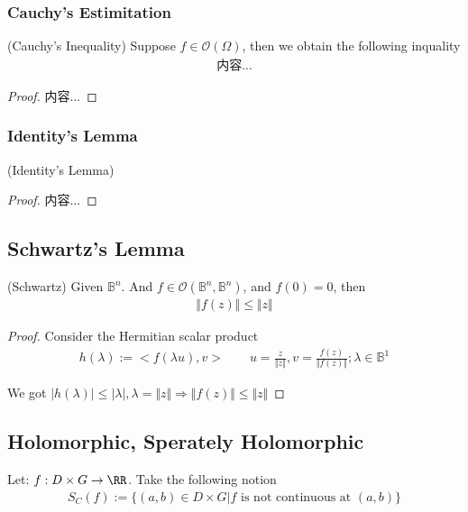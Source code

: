 \documentclass[Total.tex]{subfiles}
\begin{document}
		\subsubsection{Cauchy's Estimitation}
			\begin{proposition}
				(Cauchy's Inequality) Suppose $f\in \mathcal{O}(\Omega)$, then we obtain the following inquality
				\begin{gather*}
					内容...
				\end{gather*}
			\end{proposition}
			\begin{proof}
				内容...
			\end{proof}
			
		\subsubsection{Identity's Lemma}
			\begin{theorem}
				(Identity's Lemma)
			\end{theorem}
			\begin{proof}
				内容...
			\end{proof}
		\subsection{Schwartz's Lemma}
			\begin{theorem}
				(Schwartz) Given $\mathbb{B}^n$. And $f\in \mathcal{O}(\mathbb{B}^n,\mathbb{B}^n)$, and $f(0)=0$, then
				\begin{gather*}
					\Vert f(z)\Vert\leq \Vert z\Vert
				\end{gather*}
			\end{theorem}
			\begin{proof}
				Consider the Hermitian scalar product
				\begin{gather*}
					h(\lambda):=<f(\lambda u),v>\qquad u=\frac{z}{\Vert z\Vert},v=\frac{f(z)}{\Vert f(z)\Vert};\lambda\in \mathbb{B}^1
				\end{gather*}
				
				We got $|h(\lambda)|\leq |\lambda|,\lambda=\Vert z\Vert\Rightarrow \Vert f(z)\Vert\leq \Vert z\Vert$
			\end{proof}
		\subsection{Holomorphic, Sperately Holomorphic}
		
			\begin{Def}
				Let: $f:D\times G\rightarrow \RR$. Take the following notion
				\begin{gather*}
					S_C(f):=\{(a,b)\in D\times G|f\mbox{ is not continuous at }(a,b)\}
				\end{gather*}
			\end{Def}
			
\end{document}
